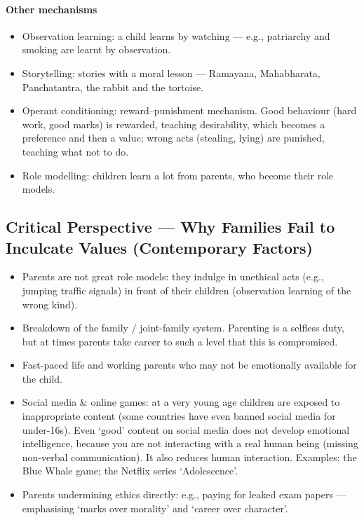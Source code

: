 \paragraph{Other mechanisms}
\begin{itemize}
\item Observation learning: a child learns by watching --- e.g., patriarchy and smoking are learnt by observation.
\item Storytelling: stories with a moral lesson --- Ramayana, Mahabharata, Panchatantra, the rabbit and the tortoise.
\item Operant conditioning: reward--punishment mechanism. Good behaviour (hard work, good marks) is rewarded, teaching desirability, which becomes a preference and then a value; wrong acts (stealing, lying) are punished, teaching what not to do.
\item Role modelling: children learn a lot from parents, who become their role models.
\end{itemize}

\subsection{Critical Perspective --- Why Families Fail to Inculcate Values (Contemporary Factors)}

\begin{itemize}
\item Parents are not great role models: they indulge in unethical acts (e.g., jumping traffic signals) in front of their children (observation learning of the wrong kind).
\item Breakdown of the family / joint-family system. Parenting is a selfless duty, but at times parents take career to such a level that this is compromised.
\item Fast-paced life and working parents who may not be emotionally available for the child.
\item Social media \& online games: at a very young age children are exposed to inappropriate content (some countries have even banned social media for under-16s). Even `good' content on social media does not develop emotional intelligence, because you are not interacting with a real human being (missing non-verbal communication). It also reduces human interaction. Examples: the Blue Whale game; the Netflix series `Adolescence'.
\item Parents undermining ethics directly: e.g., paying for leaked exam papers --- emphasising `marks over morality' and `career over character'.
\end{itemize}

